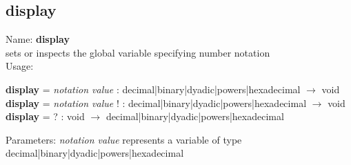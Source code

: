 \subsection{ display }
\noindent Name: \textbf{display}\\
sets or inspects the global variable specifying number notation\\

\noindent Usage: 
\begin{center}
\textbf{display} = \emph{notation value} : \textsf{decimal|binary|dyadic|powers|hexadecimal} $\rightarrow$ \textsf{void}\\
\textbf{display} = \emph{notation value} ! : \textsf{decimal|binary|dyadic|powers|hexadecimal} $\rightarrow$ \textsf{void}\\
\textbf{display} = ? : \textsf{void} $\rightarrow$ \textsf{decimal|binary|dyadic|powers|hexadecimal}\\
\end{center}
Parameters: 
\emph{notation value} represents a variable of type \textsf{decimal|binary|dyadic|powers|hexadecimal}\\

